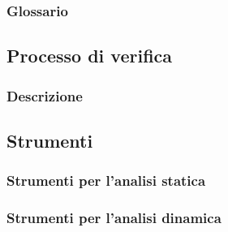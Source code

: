 \subsubsection{Glossario}

\subsection{Processo di verifica}

\subsubsection{Descrizione}

\subsection{Strumenti}

\subsubsection{Strumenti per l'analisi statica}

\subsubsection{Strumenti per l'analisi dinamica}



